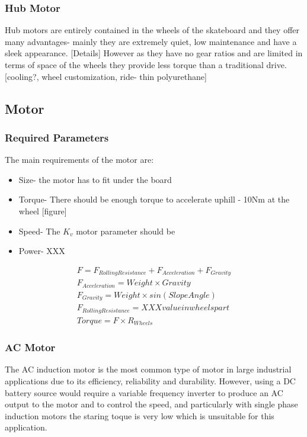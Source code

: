 \documentclass[journal,10pt]{IEEEtran}
\begin{document}
        \subsubsection{Hub Motor}
            Hub motors are entirely contained in the wheels of the skateboard and they offer many advantages- mainly they are extremely quiet, low maintenance and have a sleek appearance. [Details]
            However as they have no gear ratios and are limited in terms of space of the wheels they provide less torque than a traditional drive. [cooling?, wheel customization, ride- thin polyurethane]
    \subsection{Motor}
        \subsubsection{Required Parameters}
        The main requirements of the motor are:
        \begin{itemize}
        	\item Size- the motor has to fit under the board
        	\item Torque- There should be enough torque to accelerate uphill - 10Nm at the wheel [figure]
        	\item Speed- The $K_{v}$ motor parameter should be 
        	\item Power- XXX
        \end{itemize}
        \begin{gather*}
            F = F_{Rolling Resistance} + F_{Acceleration} + F_{Gravity}
            \\F_{Acceleration} = Weight \times Gravity
            \\F_{Gravity} = Weight \times sin(Slope  Angle)
            \\F_{Rolling Resistance} = XXX value in wheels part
            \\Torque = F \times R_{Wheels}
        \end{gather*}

        \subsubsection{AC Motor}
            The AC induction motor is the most common type of motor in large industrial applications due to its efficiency, reliability and durability. However, using a DC battery source would require a variable frequency inverter to produce an AC output to the motor and to control the speed, and particularly with single phase induction motors the staring toque is very low which is unsuitable for this application. 
\end{document}
